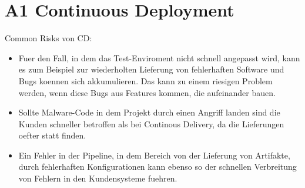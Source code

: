 \documentclass[12pt]{article}
\begin{document}
\section*{A1 Continuous Deployment}

Common Risks von CD: 

\begin{itemize}
  
  \item Fuer den Fall, in dem das Test-Enviroment nicht schnell angepasst wird, kann es zum Beispiel zur wiederholten Lieferung 
  von fehlerhaften Software und Bugs koennen sich akkumulieren. Das kann zu einem riesigen Problem werden, wenn diese Bugs aus Features kommen, die 
  aufeinander bauen. 
  
  \item Sollte Malware-Code in dem Projekt durch einen Angriff landen sind die Kunden schneller betroffen als bei Continous Delivery, da 
  die Lieferungen oefter statt finden.

  \item Ein Fehler in der Pipeline, in dem Bereich von der Lieferung von Artifakte, durch fehlerhaften Konfigurationen kann ebenso so 
    der schnellen Verbreitung von Fehlern in den Kundensysteme fuehren.

\end{itemize}
\end{document}
